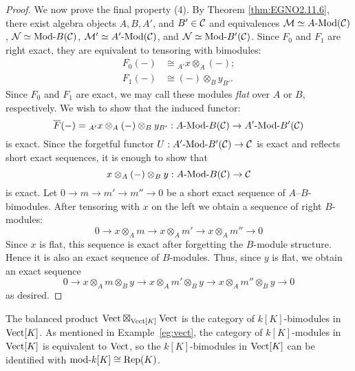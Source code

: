 \documentclass{amsart}
\begin{document}
\begin{proof}
We now prove the final property (4). By Theorem \ref{thm:EGNO2.11.6}, there exist algebra objects $A, B, A'$, and $B' \in \mathcal C$ and equivalences $\cM \simeq \Mod{A}{}(\cC)$, $\cN \simeq \Mod{}{B}(\cC)$, $\cM' \simeq \Mod{A'}{}(\cC)$, and $\cN \simeq \Mod{}{B'}(\cC)$. Since $F_0$ and $F_1$ are right exact, they are equivalent to tensoring with bimodules:
\begin{align*}
	F_0(-) &\cong {}_{A'}x \otimes_A (-); \\
	F_1(-) & \cong (-) \otimes_B y_{B'}.
\end{align*}
Since $F_0$ and $F_1$ are exact, we may call these modules {\em flat} over $A$ or $B$, respectively. We wish to show that the induced functor:
\begin{equation*}
	\overline{F}(-) = {}_{A'}x \otimes_A (-) \otimes_B y_{B'}: \Mod{A}{B}(\cC) \to \Mod{A'}{B'}(\cC)
\end{equation*}
is exact. Since the forgetful functor $U: \Mod{A'}{B'}(\cC) \to \cC$ is exact and reflects short exact sequences, it is enough to show that 
\begin{equation*}
	x \otimes_A (-) \otimes_B y: \Mod{A}{B}(\cC) \to \cC
\end{equation*}
is exact. Let $0 \to m \to m' \to m'' \to 0$ be a short exact sequence of $A$--$B$-bimodules. After tensoring with $x$ on the left we obtain a sequence of right $B$-modules:
\begin{equation*}
	0 \to x \otimes_A m \to x \otimes_A m' \to x \otimes_A {m''} \to 0
\end{equation*}
Since $x$ is flat, this sequence is exact after forgetting the $B$-module structure. Hence it is also an exact sequence of $B$-modules. Thus, since $y$ is flat, we obtain an exact sequence
\begin{equation*}
		0 \to x \otimes_A m \otimes_B y \to x \otimes_A m'\otimes_B y \to x \otimes_A {m''}  \otimes_B y \to 0
\end{equation*}
	as desired. 
\end{proof}

\begin{example}
The balanced product $\mathrm{Vect} \boxtimes_{\mathrm{Vect}[K]} \mathrm{Vect}$ is the category of $k[K]$-bimodules in $\mathrm{Vect}[K]$. As mentioned in Example~\ref{eg:vect}, the category of $k[K]$-modules in $\mathrm{Vect}[K]$ is equivalent to $\mathrm{Vect}$, so the $k[K]$-bimodules in $\mathrm{Vect}[K]$ can be identified with $\text{mod-}k[K] \cong \mathrm{Rep}(K)$.
\end{example}
\end{document}
